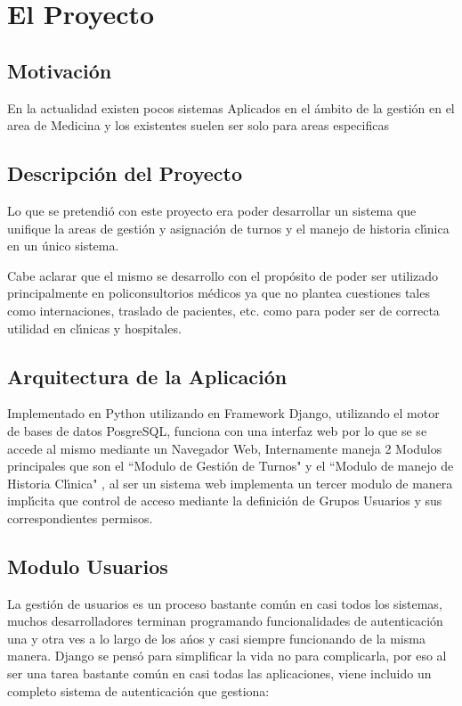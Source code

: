 \chapter{El Proyecto}


\section{Motivaci\'on}

En la actualidad existen pocos sistemas Aplicados en el \'ambito de la gesti\'on en
el area de Medicina y los existentes suelen ser solo para areas especificas


\section{Descripci\'on del Proyecto}

Lo que se pretendi\'o con este proyecto era poder desarrollar un sistema que unifique
la areas de gesti\'on y asignaci\'on de turnos y el manejo de historia cl\'{\i}nica en 
un \'unico sistema.

Cabe aclarar que el mismo se desarrollo con el prop\'osito de poder ser utilizado 
principalmente en policonsultorios m\'edicos ya que no plantea cuestiones tales como
internaciones, traslado de pacientes, etc. como para poder ser de correcta utilidad
en cl\'{\i}nicas y hospitales. 


\section{Arquitectura de la Aplicaci\'on}

Implementado en Python utilizando en Framework Django, utilizando el motor de bases
de datos PosgreSQL, funciona con una interfaz web por lo que se se accede al
mismo mediante un Navegador Web, Internamente maneja 2 Modulos principales
que son el  ``Modulo de Gesti\'on de Turnos" y el ``Modulo de manejo de
Historia Cl\'{\i}nica" , al ser un sistema web implementa un tercer modulo de manera
impl\'{\i}cita que control de acceso mediante la definici\'on de Grupos Usuarios y
sus correspondientes permisos.


\section{Modulo Usuarios}

La gesti\'on de usuarios es un proceso bastante com\'un en casi todos los sistemas,
muchos desarrolladores terminan programando funcionalidades de autenticaci\'on 
una y otra ves a lo largo de los a\'nos y casi siempre funcionando de la misma 
manera. Django se pens\'o para simplificar la vida no para complicarla, por eso
al ser una tarea bastante com\'un en casi todas las aplicaciones, viene incluido
un completo sistema de autenticaci\'on que gestiona:

